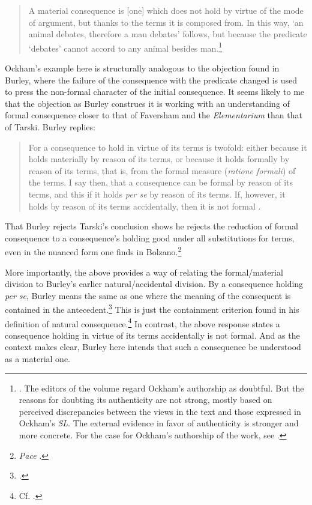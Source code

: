 	\begin{quote}
		A material consequence is [one] which does not hold by virtue of the mode of argument, but thanks to the terms it is composed from. In this way, `an animal debates, therefore a man debates' follows, but because the predicate `debates' cannot accord to any animal besides man.\footnote{\cite[VI. 4, p. 163]{OckhamEL}. The editors of the volume regard Ockham's authorship as doubtful. But the reasons for doubting its authenticity are not strong, mostly based on perceived discrepancies between the views in the text and those expressed in Ockham's \textit{SL}. The external evidence in favor of authenticity is stronger and more concrete. For the case for Ockham's authorship of the work, see \cite{Boehner1958b}.}
	\end{quote}
	
	Ockham's example here is structurally analogous to the objection found in Burley, where the failure of the consequence with the predicate changed is used to press the non-formal character of the initial consequence. It seems likely to me that the objection as Burley construes it is working with an understanding of formal consequence closer to that of Faversham and the \textit{Elementarium} than that of Tarski. Burley replies:
	\begin{quote}
		For a consequence to hold in virtue of its terms is twofold: either because it holds materially by reason of its terms, or because it holds formally by reason of its terms, that is, from the formal measure (\textit{ratione formali}) of the terms. I say then, that a consequence can be formal by reason of its terms, and this if it holds \textit{per se} by reason of its terms. If, however, it holds by reason of its terms accidentally, then it is not formal \autocite[173]{BurleyDPAL}.
	\end{quote}
	That Burley rejects Tarski's conclusion shows he rejects the reduction of formal consequence to a consequence's holding good under all substitutions for terms, even in the nuanced form one finds in Bolzano.\footnote{\textit{Pace} \cite[pp. 16-17]{HodgesBurley}.} 
	
	More importantly, the above provides a way of relating the formal/material division to Burley's earlier natural/accidental division. By a consequence holding \textit{per se}, Burley means the same as one where the meaning of the consequent is contained in the antecedent.\footnote{\autocite[p. 158, par. 160]{Green-Pedersen1980b}.} This is just the containment criterion found in his definition of natural consequence.\footnote{Cf. \autocite[I, d. 11, q. 2]{ScotusRepPar}.} In contrast, the above response states a consequence holding in virtue of its terms accidentally is not formal. And as the context makes clear, Burley here intends that such a consequence be understood as a material one.
	
